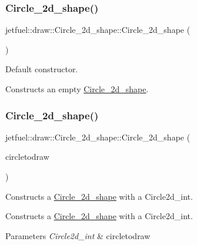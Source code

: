 \subsubsection{\texorpdfstring{Circle\+\_\+2d\+\_\+shape()}{Circle\_2d\_shape()}\hspace{0.1cm}{\footnotesize\ttfamily [1/2]}}
{\footnotesize\ttfamily jetfuel\+::draw\+::\+Circle\+\_\+2d\+\_\+shape\+::\+Circle\+\_\+2d\+\_\+shape (\begin{DoxyParamCaption}{ }\end{DoxyParamCaption})\hspace{0.3cm}{\ttfamily [inline]}}



Default constructor. 

Constructs an empty \hyperlink{classjetfuel_1_1draw_1_1Circle__2d__shape}{Circle\+\_\+2d\+\_\+shape}. \mbox{\label{classjetfuel_1_1draw_1_1Circle__2d__shape_ad2be0a546c65e671a92dd30e20461afe}} 
\subsubsection{\texorpdfstring{Circle\+\_\+2d\+\_\+shape()}{Circle\_2d\_shape()}\hspace{0.1cm}{\footnotesize\ttfamily [2/2]}}
{\footnotesize\ttfamily jetfuel\+::draw\+::\+Circle\+\_\+2d\+\_\+shape\+::\+Circle\+\_\+2d\+\_\+shape (\begin{DoxyParamCaption}\item[{const \hyperlink{classjetfuel_1_1draw_1_1Circle2d}{Circle2d\+\_\+int}}]{circletodraw }\end{DoxyParamCaption})}



Constructs a \hyperlink{classjetfuel_1_1draw_1_1Circle__2d__shape}{Circle\+\_\+2d\+\_\+shape} with a Circle2d\+\_\+int. 

Constructs a \hyperlink{classjetfuel_1_1draw_1_1Circle__2d__shape}{Circle\+\_\+2d\+\_\+shape} with a Circle2d\+\_\+int.


\begin{DoxyParams}{Parameters}
{\em Circle2d\+\_\+int} & circletodraw \\
\hline
\end{DoxyParams}


